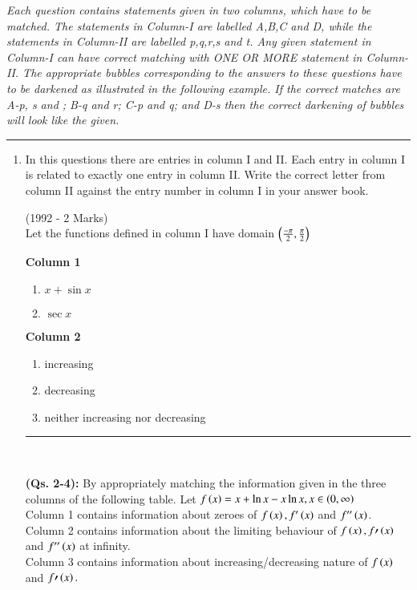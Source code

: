 \documentclass[journal]{IEEEtran}
\begin{document}
{\em Each question contains statements given in two columns, which have to be matched. The statements in Column-I are labelled A,B,C and D, while the statements in Column-II are labelled p,q,r,s and t. Any given statement in Column-I can have correct matching with ONE OR MORE statement in Column-II. The appropriate bubbles corresponding to the answers to these questions have to be darkened as illustrated in the following example. If the correct matches are A-p, s and ; B-q and r;  C-p and q; and D-s then the correct darkening of bubbles will look like the given.}\\
\hrule
\begin{enumerate}
    \item In this questions there are entries in column I and II. Each entry in column I is related to exactly one entry in column II. Write the correct letter from column II against the entry number in column I in your answer book.

\hfill{(1992 - 2 Marks)}\\
Let the functions defined in column I have domain $\left(\frac{-\pi}{2},\frac{\pi}{2}\right)$\\
\begin{minipage}[t]{0.32\textwidth}
 \textbf{Column 1}\\
 \begin{enumerate}[label=(\Alph*)]
     \item $x+ \sin x$
     \item $\sec x$
 \end{enumerate}
     \end{minipage}
     \hfill
\begin{minipage}[t]{0.32\textwidth}
    \textbf{Column 2}\\
    \begin{enumerate}[label=(\alph*), start=16]
    \item increasing
    \item decreasing
    \item neither increasing nor decreasing
\end{enumerate}
\end{minipage}
\hrule\


\textbf{(Qs. 2-4):} 
By appropriately matching the information given in the three columns of the following table.
Let $f\left(x\right) = x+\ln x-x\ln x, x\in\left(0,\infty\right)$\\
Column 1 contains information about zeroes of $f\left(x\right), f^{\prime}\left(x\right)$ and $f^{\prime\prime}\left(x\right)$.\\
Column 2 contains information about the limiting behaviour of $f\left(x\right), f{\prime}\left(x\right)$ and $f^{\prime\prime}\left(x\right)$ at infinity.\\
Column 3 contains information about increasing/decreasing nature of $f\left(x\right)$ and $f{\prime}\left(x\right).$\\



\end{enumerate}
\end{document}
